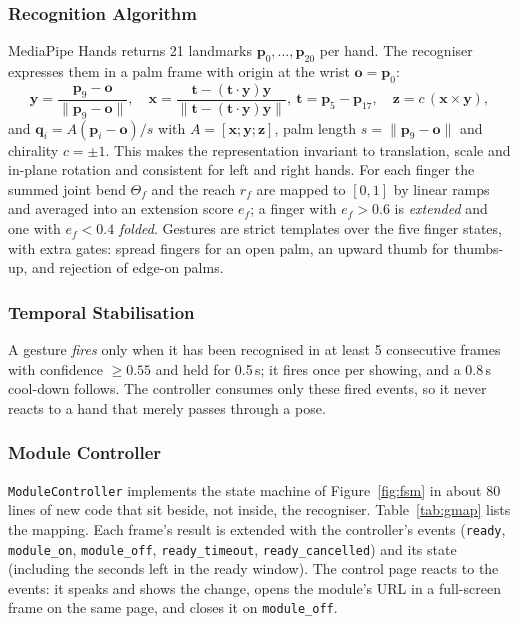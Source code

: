 \documentclass[12pt,singleside,a4paper]{article}
\begin{document}
\subsubsection{Recognition Algorithm}
MediaPipe Hands \cite{zhang2020mediapipe,mediapipe_repo} returns 21 landmarks $\mathbf{p}_0,\dots,\mathbf{p}_{20}$ per hand. The recogniser expresses them in a palm frame with origin at the wrist $\mathbf{o}=\mathbf{p}_0$:
\begin{equation}
\mathbf{y}=\frac{\mathbf{p}_9-\mathbf{o}}{\lVert\mathbf{p}_9-\mathbf{o}\rVert},\quad
\mathbf{x}=\frac{\mathbf{t}-(\mathbf{t}\cdot\mathbf{y})\mathbf{y}}{\lVert\mathbf{t}-(\mathbf{t}\cdot\mathbf{y})\mathbf{y}\rVert},\ \mathbf{t}=\mathbf{p}_5-\mathbf{p}_{17},\quad
\mathbf{z}=c\,(\mathbf{x}\times\mathbf{y}),
\end{equation}
and $\mathbf{q}_i=A(\mathbf{p}_i-\mathbf{o})/s$ with $A=[\mathbf{x};\mathbf{y};\mathbf{z}]$, palm length $s=\lVert\mathbf{p}_9-\mathbf{o}\rVert$ and chirality $c=\pm1$. This makes the representation invariant to translation, scale and in-plane rotation and consistent for left and right hands. For each finger the summed joint bend $\Theta_f$ and the reach $r_f$ are mapped to $[0,1]$ by linear ramps and averaged into an extension score $e_f$; a finger with $e_f>0.6$ is \emph{extended} and one with $e_f<0.4$ \emph{folded}. Gestures are strict templates over the five finger states, with extra gates: spread fingers for an open palm, an upward thumb for thumbs-up, and rejection of edge-on palms.

\subsubsection{Temporal Stabilisation}
A gesture \emph{fires} only when it has been recognised in at least 5 consecutive frames with confidence $\geq 0.55$ and held for 0.5\,s; it fires once per showing, and a 0.8\,s cool-down follows. The controller consumes only these fired events, so it never reacts to a hand that merely passes through a pose.

\subsubsection{Module Controller}
\texttt{ModuleController} implements the state machine of Figure~\ref{fig:fsm} in about 80 lines of new code that sit beside, not inside, the recogniser. Table~\ref{tab:gmap} lists the mapping. Each frame's result is extended with the controller's events (\texttt{ready}, \texttt{module\_on}, \texttt{module\_off}, \texttt{ready\_timeout}, \texttt{ready\_cancelled}) and its state (including the seconds left in the ready window). The control page reacts to the events: it speaks and shows the change, opens the module's URL in a full-screen frame on the same page, and closes it on \texttt{module\_off}.
\end{document}
